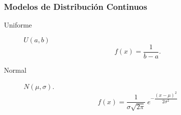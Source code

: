 \documentclass[a4paper]{article}
\newlength{\mylength}
\newenvironment{marco}{
	\setlength{\fboxsep}{5pt}
	\setlength{\mylength}{\textwidth}
	\addtolength{\mylength}{-2\fboxsep}
	\addtolength{\mylength}{-2\fboxrule}
	\noindent
	\begin{Sbox}
	\begin{minipage}{\mylength}
	\setlength{\abovedisplayskip}{3pt}
	\setlength{\belowdisplayskip}{3pt}
}
{
	\end{minipage}
	\end{Sbox}
	\fbox{\TheSbox}
}
\begin{document}
\begin{marco}
\begin{multicols}{2}
\subsubsection*{Modelos de Distribución Continuos}
\begin{description}
\item [Uniforme] $U(a,b)$
\[f(x)=\frac{1}{b-a}.\]
\item [Normal] $N(\mu,\sigma)$.
\[
f(x)=\dfrac{1}{\sigma \sqrt{2\pi }}\ e^{-\dfrac{(x-\mu )^{2}}{2\sigma ^{2}}}
\]
\end{description}
\end{multicols}
\end{marco}
\end{document}
